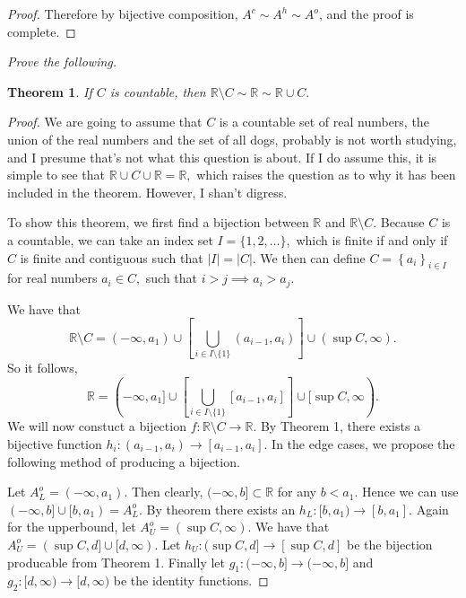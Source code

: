 \documentclass[letter]{article}
\newtheorem{theorem}{Theorem}
\newenvironment{menumerate}{%
  \edef\backupindent{\the\parindent}%
  \enumerate%
  \setlength{\parindent}{\backupindent}%
}{\endenumerate}
\begin{document}
\begin{menumerate}
\begin{menumerate}
\begin{proof}
	 			 	Therefore by bijective composition, $A^c \sim A^h \sim A^o$, and the proof is complete. 

	 			 \end{proof}

 			 \item \textit{Prove the following.} 
 			 	\begin{theorem}
 			 	If $C$ is countable, then $\mathbb{R}\setminus C \sim \mathbb{R} \sim \mathbb{R} \cup C.$
 			 	\end{theorem}
 			 	\begin{proof}
 			 		We are going to assume that $C$ is a countable set of real numbers, the union of the real numbers and the set of all dogs, probably is not worth studying, and I presume that's not what this question is about. If I do assume this, it is simple to see that $\mathbb{R} \cup C \cup \mathbb{R} = \mathbb{R},$ which raises the question as to why it has been included in the theorem. However, I shan't digress. 

 			 		To show this theorem, we first find a bijection between $\mathbb{R}$ and $\mathbb{R} \setminus C$. Because $C$ is a countable, we can take an index set $I = \{1,2,\dots\},$ which is finite if and only if $C$ is finite and contiguous such that $|I| = |C|.$ We then can define $C = \left\{a_i \right\}_{i \in I}$ for real numbers $a_i \in C,$ such that $i > j \implies a_i > a_j$.

 			 		We have that $$\mathbb{R}\setminus C = (-\infty,a_1)\cup \left[\bigcup_{i\in I \setminus \{1\}}(a_{i-1},a_i)\right]\cup (\sup C,\infty).$$ So it follows,
 			 		 $$\mathbb{R} = (-\infty,a_1]\cup \left[\bigcup_{i\in I \setminus \{1\}}[a_{i-1},a_i]\right]\cup [\sup C,\infty).$$ We will now constuct a bijection $f:\mathbb{R}\setminus C \to \mathbb{R}.$ By Theorem 1, there exists a bijective function $h_i : (a_{i-1}, a_i) \to [a_{i-1}, a_i].$ In the edge cases, we propose the following method of producing a bijection.

 			 		 Let $A_L^o = (-\infty, a_1)$. Then clearly, $(-\infty, b] \subset \mathbb{R}$ for any $b < a_1.$ Hence we can use $(-\infty,b] \cup [b,a_1) = A_L^o.$ By theorem there exists an $h_L:[b,a_1) \to [b,a_1].$ Again for the upperbound, let $A_U^o = (\sup C, \infty).$ We have that $A_U^o = (\sup C, d] \cup [d, \infty)$. Let $h_U : (\sup C, d] \to [\sup C, d]$ be the bijection producable from Theorem 1. Finally let $g_1: (-\infty,b]\to (-\infty,b]$ and $g_2: [d,\infty)\to [d,\infty)$ be the identity functions. 


\end{proof}
\end{menumerate}
\end{menumerate}
\end{document}
